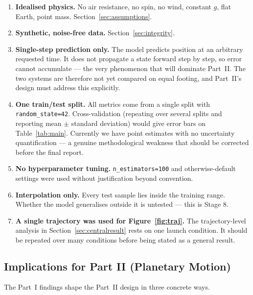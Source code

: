\documentclass[11pt,a4paper]{article}
\begin{document}
\begin{enumerate}[leftmargin=2em,itemsep=0.2em]
  \item \textbf{Idealised physics.} No air resistance, no spin, no wind, constant $g$, flat Earth,
        point mass. Section~\ref{sec:assumptions}.
  \item \textbf{Synthetic, noise-free data.} Section~\ref{sec:integrity}.
  \item \textbf{Single-step prediction only.} The model predicts position at an arbitrary requested
        time. It does not propagate a state forward step by step, so error cannot accumulate --- the
        very phenomenon that will dominate Part~II. The two systems are therefore not yet compared on
        equal footing, and Part~II's design must address this explicitly.
  \item \textbf{One train/test split.} All metrics come from a single split with
        \texttt{random\_state=42}. Cross-validation (repeating over several splits and reporting mean
        $\pm$ standard deviation) would give error bars on Table~\ref{tab:main}. Currently we have
        point estimates with no uncertainty quantification --- a genuine methodological weakness that
        should be corrected before the final report.
  \item \textbf{No hyperparameter tuning.} \texttt{n\_estimators=100} and otherwise-default settings
        were used without justification beyond convention.
  \item \textbf{Interpolation only.} Every test sample lies inside the training range. Whether the
        model generalises outside it is untested --- this is Stage 8.
  \item \textbf{A single trajectory was used for Figure~\ref{fig:traj}.} The trajectory-level
        analysis in Section~\ref{sec:centralresult} rests on one launch condition. It should be
        repeated over many conditions before being stated as a general result.
\end{enumerate}

\subsection{Implications for Part II (Planetary Motion)}\label{sec:partii}

The Part~I findings shape the Part~II design in three concrete ways.
\end{document}
